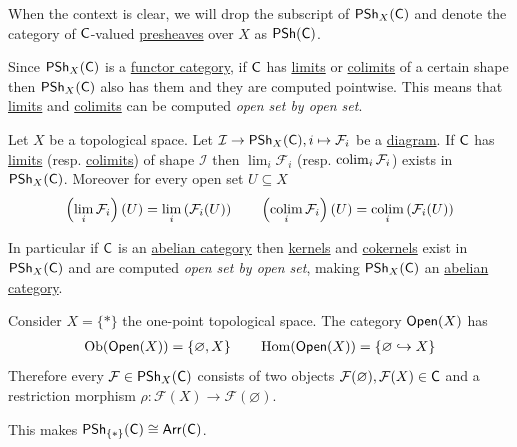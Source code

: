 \documentclass[../../../main]{subfiles}
\begin{document}
\begin{notation}
  When the context is clear, we will drop the subscript of \(\mathsf{PSh}_{X}(\mathsf{C})\) and denote the category of \(\mathsf{C}\)-valued \hyperref[def:presheaf]{presheaves} over \(X\) as \(\mathsf{PSh}(\mathsf{C})\).
\end{notation}

Since \(\mathsf{PSh}_{X}(\mathsf{C})\) is a \hyperref[def:functor-category]{functor category}, if \(\mathsf{C}\) has \hyperref[def:categorical-limit]{limits} or \hyperref[def:categorical-colimit]{colimits} of a certain shape then \(\mathsf{PSh}_{X}(\mathsf{C})\) also has them and they are computed pointwise.
This means that \hyperref[def:categorical-limit]{limits} and \hyperref[def:categorical-colimit]{colimits} can be computed \textit{open set by open set}.

\begin{proposition} \label{prop:limits-colimits-presheaf}
  Let \(X\) be a topological space.
  Let \(\mathcal{I} \to \mathsf{PSh}_{X}(\mathsf{C}), i \mapsto \mathcal{F}_{i}\) be a \hyperref[def:diagram]{diagram}.
  If \(\mathsf{C}\) has \hyperref[def:categorical-limit]{limits} (resp. \hyperref[def:categorical-colimit]{colimits}) of shape \(\mathcal{I}\) then \(\lim_{i} \mathcal{F}_{i}\) (resp. \(\operatorname*{colim}_{i} \mathcal{F}_{i}\)) exists in \(\mathsf{PSh}_{X}(\mathsf{C})\).
  Moreover for every open set \(U \subseteq X\)
  \begin{align*}
    \left( \lim_{i} \mathcal{F}_{i} \right)(U) = \lim_{i} \left( \mathcal{F}_{i}(U) \right) \qquad \left( \operatorname*{colim}_{i} \mathcal{F}_{i} \right)(U) = \operatorname*{colim}_{i} \left( \mathcal{F}_{i}(U) \right)
  \end{align*}
\end{proposition}

In particular if \(\mathsf{C}\) is an \hyperref[def:abelian-category]{abelian category} then \hyperref[def:categorical-kernel]{kernels} and \hyperref[def:categorical-cokernel]{cokernels} exist in \(\mathsf{PSh}_{X}(\mathsf{C})\) and are computed \textit{open set by open set}, making \(\mathsf{PSh}_{X}(\mathsf{C})\) an \hyperref[def:abelian-category]{abelian category}.

\begin{example} \label{ex:one-point-presheaf}
  Consider \(X = \{\ast\}\) the one-point topological space.
  The category \(\mathsf{Open}(X)\) has
  \begin{align*}
    \operatorname{Ob}(\mathsf{Open}(X)) = \{\varnothing, X \} \qquad \operatorname{Hom}(\mathsf{Open}(X)) = \{\varnothing \hookrightarrow X\}
  \end{align*}
  Therefore every \(\mathcal{F} \in \mathsf{PSh}_{X}(\mathsf{C})\) consists of two objects \(\mathcal{F}(\varnothing), \mathcal{F}(X) \in \mathsf{C}\) and a restriction morphism \(\rho: \mathcal{F}(X) \to \mathcal{F}(\varnothing)\).

  This makes \(\mathsf{PSh}_{\{\ast\}}(\mathsf{C}) \cong \mathsf{Arr}(\mathsf{C})\).
\end{example}
\end{document}
